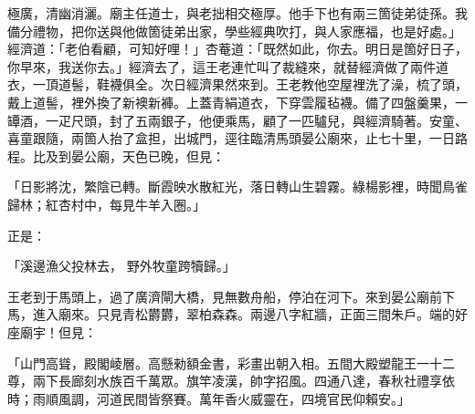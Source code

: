 \begin{showcontents}{}
極廣，清幽消灑。廟主任道士，與老拙相交極厚。他手下也有兩三箇徒弟徒孫。我備分禮物，把你送與他做箇徒弟出家，學些經典吹打，與人家應福，也是好處。」經濟道：「老伯看顧，可知好哩！」杏菴道：「既然如此，你去。明日是箇好日子，你早來，我送你去。」經濟去了，這王老連忙叫了裁縫來，就替經濟做了兩件道衣，一頂道髻，鞋襪俱全。次日經濟果然來到。王老教他空屋裡洗了澡，梳了頭，戴上道髻，裡外換了新襖新褲。上蓋青絹道衣，下穿雲履毡襪。備了四盤羹果，一罈酒，一疋尺頭，封了五兩銀子，他便乘馬，顧了一匹驢兒，與經濟騎著。安童、喜童跟隨，兩箇人抬了盒担，出城門，逕往臨清馬頭晏公廟來，止七十里，一日路程。比及到晏公廟，天色已晚，但見：

「日影將沈，繁陰已轉。斷霞映水散紅光，落日轉山生碧霧。綠楊影裡，時聞鳥雀歸林；紅杏村中，每見牛羊入圈。」

正是：

「溪邊漁父投林去，  野外牧童跨犢歸。」

王老到于馬頭上，過了廣濟閘大橋，見無數舟船，停泊在河下。來到晏公廟前下馬，進入廟來。只見青松欝欝，翠柏森森。兩邊八字紅牆，正面三間朱戶。端的好座廟宇！但見：

「山門高聳，殿閣崚層。高懸勑額金書，彩畫出朝入相。五間大殿塑龍王一十二尊，兩下長廊刻水族百千萬眾。旗竿凌漢，帥字招風。四通八達，春秋社禮享依時；雨順風調，河道民間皆祭賽。萬年香火威靈在，四境官民仰賴安。」


\end{showcontents}
